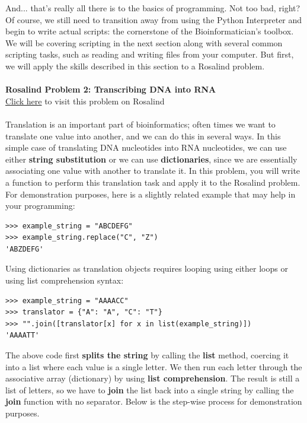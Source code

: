 \documentclass[a4paper,11pt]{article}
\begin{document}
And... that's really all there is to the basics of programming.  Not too bad, right?  Of course, we 
still need to transition away from using the Python Interpreter and begin to write actual scripts: the 
cornerstone of the Bioinformatician's toolbox.  We will be covering scripting in the next section along 
with several common scripting tasks, such as reading and writing files from your computer.  
But first, we will apply the skills described in this section to a Rosalind problem. \\
\\
\textbf{Rosalind Problem 2: Transcribing DNA into RNA} \\
\href{http://rosalind.info/problems/rna/?class=246}{Click here} to visit this problem on Rosalind \\
\\
Translation is an important part of bioinformatics; often times we want to translate one value into another, 
and we can do this in several ways.  In this simple case of translating DNA nucleotides into RNA nucleotides, 
we can use either \textbf{string substitution} or we can use \textbf{dictionaries}, since we are essentially 
associating one value with another to translate it.  In this problem, you will write a function to perform 
this translation task and apply it to the Rosalind problem.  For demonstration purposes, here is a slightly 
related example that may help in your programming:

\vspace{3mm}
\begin{lstlisting}
>>> example_string = "ABCDEFG"
>>> example_string.replace("C", "Z")
'ABZDEFG'
\end{lstlisting}
\vspace{3mm}

Using dictionaries as translation objects requires looping using either loops or using list comprehension 
syntax:

\vspace{3mm}
\begin{lstlisting}
>>> example_string = "AAAACC"
>>> translator = {"A": "A", "C": "T"}
>>> "".join([translator[x] for x in list(example_string)])
'AAAATT'
\end{lstlisting}
\vspace{3mm}

The above code first \textbf{splits the string} by calling the \textbf{list} method, coercing it into a list 
where each value is a single letter.  We then run each letter through the associative array (dictionary) by 
using \textbf{list comprehension}.  The result is still a list of letters, so we have to \textbf{join} the 
list back into a single string by calling the \textbf{join} function with no separator.  Below is the 
step-wise process for demonstration purposes.
\end{document}
